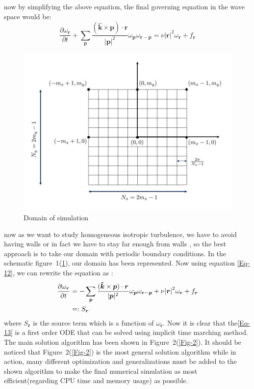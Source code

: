 \documentclass[10pt]{article}
\begin{document}
%
now by simplifying the above equation, the final governing equation in the wave space would be:
%
\begin{equation}\label{Eq-12}
\frac{\partial\omega_{\bm{r}}}{\partial t} + \sum_{\bm{p}}{\frac{(\bm{\hat{k}}\times\bm{p})\cdot\bm{r}}{|\bm{p}|^2}\omega_{\bm{p}}\omega_{\bm{r}-\bm{p}}}= \nu{|\bm{r}|}^2\omega_{\bm{r}} + f_{\bm{r}}
\end{equation}
%
\begin{figure}
\centering
\includegraphics[scale=0.5]{domain}
\caption{Domain of simulation}\label{Fig-1}
\end{figure}
%
now as we want to study homogeneous isotropic turbulence, we have to avoid having walls or in fact we have to stay far enough from walls , so the best approach is to take our domain with periodic boundary conditions. In the schematic figure~1(\ref{Fig-1}), our domain has been represented. Now using equation \eqref{Eq-12}, we can rewrite the equation as :
%
\begin{align}
\frac{\partial\omega_{\bm{r}}}{\partial t} &= -\sum_{\bm{p}}{\frac{(\bm{\hat{k}}\times\bm{p})\cdot\bm{r}}{|\bm{p}|^2}\omega_{\bm{p}}\omega_{\bm{r}-\bm{p}}}+\nu{|\bm{r}|}^2\omega_{\bm{r}} + f_{\bm{r}} \notag \\
&=: S_{\bm{r}}\label{Eq-13}
\end{align}
%
where $S_{\bm{r}}$ is the source term which is a function of $\omega_{\bm{r}}$. Now it is clear that the\eqref{Eq-13} is a first order ODE that can be solved using implicit time marching method. The main solution algorithm has been shown in Figure~2(\ref{Fig-2}). It should be noticed that Figure~2(\ref{Fig-2}) is the most general solution algorithm while in action, many different optimization and generalizations must be added to the shown algorithm to make the final numerical simulation as most efficient(regarding CPU time and memory usage) as possible.
\end{document}

